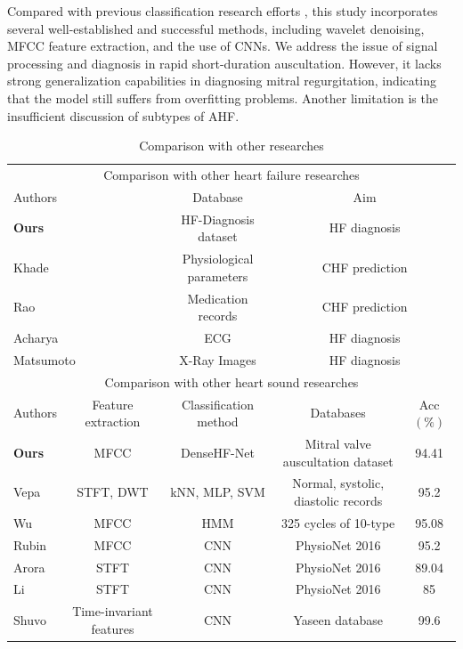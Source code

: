 Compared with previous classification research efforts \cite{vepa2009classification, wu2010hidden, rubin2016classifying, arora2021transfer, li2021lightweight, shuvo2021cardioxnet}, this study incorporates several well-established and successful methods, including wavelet denoising, MFCC feature extraction, and the use of CNNs. We address the issue of signal processing and diagnosis in rapid short-duration auscultation. However, it lacks strong generalization capabilities in diagnosing mitral regurgitation, indicating that the model still suffers from overfitting problems. 
Another limitation is the insufficient discussion of subtypes of AHF.

\begin{table}[!h]
 \caption{Comparison with other researches}
  \label{tab:Comparison}
    \centering
    \begin{tabular}{lcccc}
        \toprule
		 \multicolumn{5}{c}{Comparison with other heart failure researches}\\
        \multicolumn{2}{l}{Authors} & \multicolumn{1}{c}{Database} & \multicolumn{2}{c}{Aim}\\
        \midrule
        \multicolumn{2}{l}{\textbf{Ours}} & \multicolumn{1}{c}{HF-Diagnosis dataset} & \multicolumn{2}{c}{HF diagnosis}\\
        \multicolumn{2}{l}{Khade \cite{khade2019system}} & \multicolumn{1}{c}{Physiological parameters}& \multicolumn{2}{c}{CHF prediction}\\
        \multicolumn{2}{l}{Rao \cite{rao2022explainable}} & \multicolumn{1}{c}{Medication records} & \multicolumn{2}{c}{CHF prediction}\\
        \multicolumn{2}{l}{Acharya \cite{acharya2019deep}} & \multicolumn{1}{c}{ECG} & \multicolumn{2}{c}{HF diagnosis}\\
        \multicolumn{2}{l}{Matsumoto \cite{matsumoto2020diagnosing}} & \multicolumn{1}{c}{X-Ray Images} & \multicolumn{2}{c}{HF diagnosis} \\
        \toprule
		 \multicolumn{5}{c}{Comparison with other heart sound researches}\\
        Authors & Feature extraction & Classification method & Databases & Acc$(\%)$ \\
                \midrule
        \textbf{Ours} & MFCC & DenseHF-Net & Mitral valve auscultation dataset & 94.41 \\
        Vepa \cite{vepa2009classification} & STFT, DWT & kNN, MLP, SVM & Normal, systolic, diastolic records& 95.2\\
        Wu \cite{wu2010hidden} & MFCC & HMM & 325 cycles of 10-type& 95.08 \\
        Rubin \cite{rubin2016classifying} & MFCC & CNN & PhysioNet 2016& 95.2\\
        Arora \cite{arora2021transfer} & STFT & CNN & PhysioNet 2016& 89.04\\
        Li \cite{li2021lightweight} & STFT & CNN & PhysioNet 2016 & 85\\
        Shuvo \cite{shuvo2021cardioxnet} & Time-invariant features &CNN & Yaseen database& 99.6\\
        \bottomrule
    \end{tabular}
\end{table}
